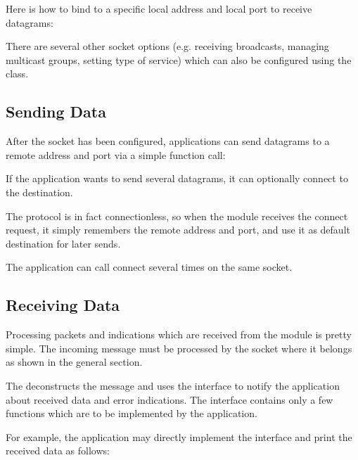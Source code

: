 Here is how to bind to a specific local address and local port to receive
 datagrams:


There are several other socket options (e.g. receiving broadcasts, managing
multicast groups, setting type of service) which can also be configured using
the  class.

\subsection*{Sending Data}

After the socket has been configured, applications can send datagrams to a
remote address and port via a simple function call:


If the application wants to send several datagrams, it can optionally connect to
the destination.

The  protocol is in fact connectionless, so when the 
module receives the connect request, it simply remembers the remote address and
port, and use it as default destination for later sends.


The application can call connect several times on the same socket.

\subsection*{Receiving Data}

Processing packets and indications which are received from the 
module is pretty simple. The incoming message must be processed by the socket
where it belongs as shown in the general section.

The  deconstructs the message and uses the
 interface to notify the application about
received data and error indications. The 
interface contains only a few functions which are to be implemented by the
application.


For example, the application may directly implement the
 interface and print the received data as
follows:

